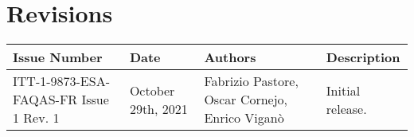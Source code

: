 
\section*{Revisions}
\label{sec:revisions}


\setlength\LTleft{0pt}
\setlength\LTright{0pt}
\tiny 
\begin{longtable}{|p{2cm}|p{1cm}|p{1.5cm}|p{9cm}|@{}}
\label{table:codeoperators} \\
\hline
\textbf{Issue Number}&\textbf{Date}&\textbf{Authors}&\textbf{Description}\\
\hline
ITT-1-9873-ESA-FAQAS-FR
Issue 1 Rev. 1&
October 29th, 2021&
Fabrizio Pastore, Oscar Cornejo, Enrico Viganò&
\begin{minipage}{8cm}
Initial release.
\end{minipage}
\\

\hline
                                                    
\end{longtable}
\normalsize

\clearpage
